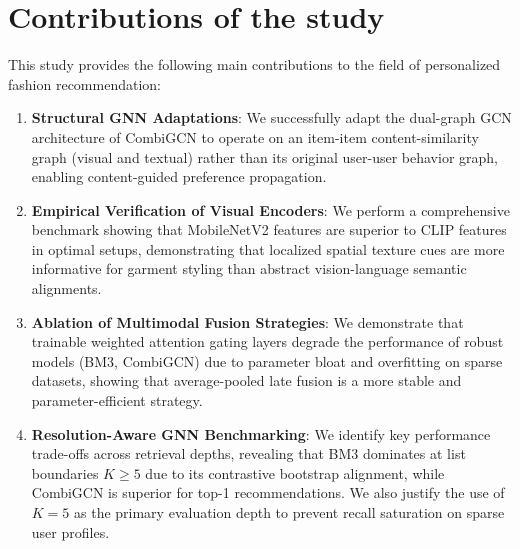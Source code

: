 \section{Contributions of the study}

This study provides the following main contributions to the field of personalized fashion recommendation:
\begin{enumerate}
    \item \textbf{Structural GNN Adaptations}: We successfully adapt the dual-graph GCN architecture of CombiGCN to operate on an item-item content-similarity graph (visual and textual) rather than its original user-user behavior graph, enabling content-guided preference propagation.
    \item \textbf{Empirical Verification of Visual Encoders}: We perform a comprehensive benchmark showing that MobileNetV2 features are superior to CLIP features in optimal setups, demonstrating that localized spatial texture cues are more informative for garment styling than abstract vision-language semantic alignments.
    \item \textbf{Ablation of Multimodal Fusion Strategies}: We demonstrate that trainable weighted attention gating layers degrade the performance of robust models (BM3, CombiGCN) due to parameter bloat and overfitting on sparse datasets, showing that average-pooled late fusion is a more stable and parameter-efficient strategy.
    \item \textbf{Resolution-Aware GNN Benchmarking}: We identify key performance trade-offs across retrieval depths, revealing that BM3 dominates at list boundaries $K \ge 5$ due to its contrastive bootstrap alignment, while CombiGCN is superior for top-1 recommendations. We also justify the use of $K=5$ as the primary evaluation depth to prevent recall saturation on sparse user profiles.
\end{enumerate}
